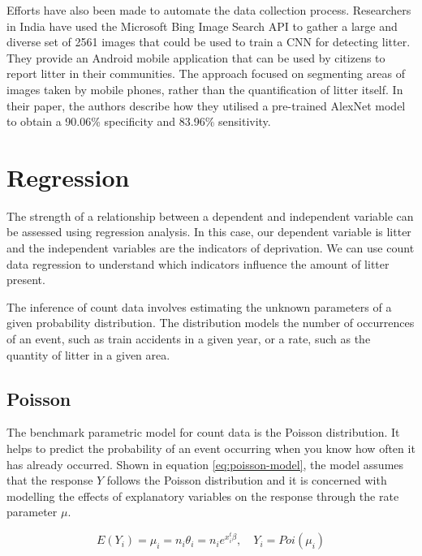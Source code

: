 \documentclass{thesis}
\begin{document}
Efforts have also been made to automate the data collection process. Researchers in India have used the Microsoft Bing Image Search API to gather a large and diverse set of 2561 images that could be used to train a CNN for detecting litter\cite{Mittal2016SpotGarbageSA}. They provide an Android mobile application that can be used by citizens to report litter in their communities. The approach focused on segmenting areas of images taken by mobile phones, rather than the quantification of litter itself. In their paper, the authors describe how they utilised a pre-trained AlexNet\cite{NIPS2012_c399862d} model to obtain a 90.06\% specificity and 83.96\% sensitivity.

\section{Regression}

The strength of a relationship between a dependent and independent variable can be assessed using regression analysis. In this case, our dependent variable is litter and the independent variables are the indicators of deprivation. We can use count data regression to understand which indicators influence the amount of litter present.

The inference of count data involves estimating the unknown parameters of a given probability distribution. The distribution models the number of occurrences of an event, such as train accidents in a given year, or a rate, such as the quantity of litter in a given area.

\subsection{Poisson}

The benchmark parametric model for count data is the Poisson distribution\cite{cameron_trivedi_2013}. It helps to predict the probability of an event occurring when you know how often it has already occurred. Shown in equation \ref{eq:poisson-model}, the model assumes that the response $Y$ follows the Poisson distribution and it is concerned with modelling the effects of explanatory variables on the response through the rate parameter $\mu$. 

\begin{equation}
    E(Y_i) = \mu_i = n_i\theta_i = n_ie^{x_i^t\beta},\hspace{1em}Y_i = Poi(\mu_i)
    \label{eq:poisson-model}
\end{equation}
\end{document}
